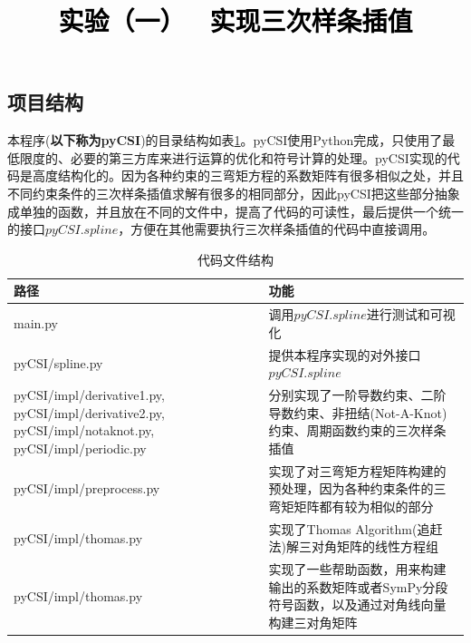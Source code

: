 \documentclass[a4paper,twoside]{article}
\newcommand{\PaperTitle}{实验（一） \ 实现三次样条插值}  %
\begin{document}
\newpage

\title{
	\Large{\textcolor{black}{\PaperTitle}}
}
	
	
\maketitle
	
\tableofcontents
 
\newpage
\begin{spacing}{1.2}

\section{项目结构}
\label{sec:struct}

本程序(\textbf{以下称为pyCSI})的目录结构如表\ref{tbl:codestruct}。pyCSI使用Python完成，只使用了最低限度的、必要的第三方库来进行运算的优化和符号计算的处理。pyCSI实现的代码是高度结构化的。因为各种约束的三弯矩方程的系数矩阵有很多相似之处，并且不同约束条件的三次样条插值求解有很多的相同部分，因此pyCSI把这些部分抽象成单独的函数，并且放在不同的文件中，提高了代码的可读性，最后提供一个统一的接口$pyCSI.spline$，方便在其他需要执行三次样条插值的代码中直接调用。

\begin{table}[h]
	\caption{代码文件结构}
	\label{tbl:codestruct}
	\begin{center}
		\begin{tabular}{p{5cm}p{8cm}}
			\toprule
			路径 & 功能 \\
			\midrule
			main.py & 调用$pyCSI.spline$进行测试和可视化 \\
			\hline
			pyCSI/spline.py & 提供本程序实现的对外接口$pyCSI.spline$ \\
			\hline
			pyCSI/impl/derivative1.py, pyCSI/impl/derivative2.py, pyCSI/impl/notaknot.py,  pyCSI/impl/periodic.py & 分别实现了一阶导数约束、二阶导数约束、非扭结(Not-A-Knot)约束、周期函数约束的三次样条插值 \\
			\hline
			pyCSI/impl/preprocess.py & 实现了对三弯矩方程矩阵构建的预处理，因为各种约束条件的三弯矩矩阵都有较为相似的部分 \\
			\hline
			pyCSI/impl/thomas.py & 实现了Thomas Algorithm(追赶法)解三对角矩阵的线性方程组 \\
			\hline
			pyCSI/impl/thomas.py & 实现了一些帮助函数，用来构建输出的系数矩阵或者SymPy分段符号函数，以及通过对角线向量构建三对角矩阵 \\
			\bottomrule
		\end{tabular}
	\end{center}
\end{table}


\end{spacing}
\end{document}
